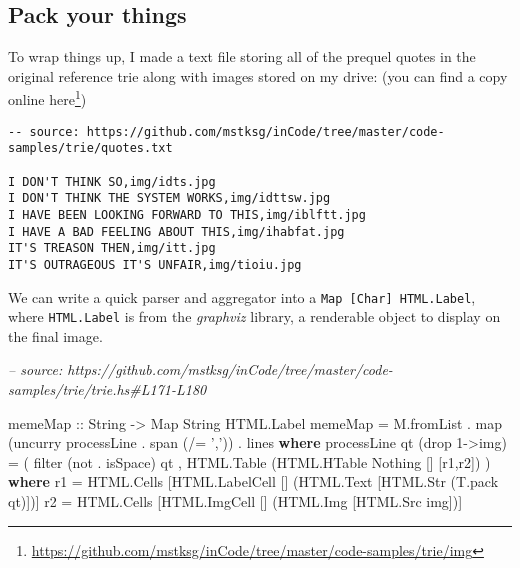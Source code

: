 \documentclass[]{article}
\newenvironment{Shaded}{}{}
\newcommand{\CharTok}[1]{\textcolor[rgb]{0.25,0.44,0.63}{#1}}
\newcommand{\CommentTok}[1]{\textcolor[rgb]{0.38,0.63,0.69}{\textit{#1}}}
\newcommand{\DataTypeTok}[1]{\textcolor[rgb]{0.56,0.13,0.00}{#1}}
\newcommand{\DecValTok}[1]{\textcolor[rgb]{0.25,0.63,0.44}{#1}}
\newcommand{\FunctionTok}[1]{\textcolor[rgb]{0.02,0.16,0.49}{#1}}
\newcommand{\KeywordTok}[1]{\textcolor[rgb]{0.00,0.44,0.13}{\textbf{#1}}}
\newcommand{\NormalTok}[1]{#1}
\newcommand{\OtherTok}[1]{\textcolor[rgb]{0.00,0.44,0.13}{#1}}
\renewcommand{\href}[2]{#2\footnote{\url{#1}}}
\begin{document}
\hypertarget{pack-your-things}{%
\subsection{Pack your things}\label{pack-your-things}}

To wrap things up, I made a text file storing all of the prequel quotes in the
original reference trie along with images stored on my drive: (you can find a
copy
\href{https://github.com/mstksg/inCode/tree/master/code-samples/trie/img}{online
here})

\begin{verbatim}
-- source: https://github.com/mstksg/inCode/tree/master/code-samples/trie/quotes.txt

I DON'T THINK SO,img/idts.jpg
I DON'T THINK THE SYSTEM WORKS,img/idttsw.jpg
I HAVE BEEN LOOKING FORWARD TO THIS,img/iblftt.jpg
I HAVE A BAD FEELING ABOUT THIS,img/ihabfat.jpg
IT'S TREASON THEN,img/itt.jpg
IT'S OUTRAGEOUS IT'S UNFAIR,img/tioiu.jpg
\end{verbatim}

We can write a quick parser and aggregator into a
\texttt{Map\ {[}Char{]}\ HTML.Label}, where \texttt{HTML.Label} is from the
\emph{graphviz} library, a renderable object to display on the final image.

\begin{Shaded}
\begin{Highlighting}[]
\CommentTok{-- source: https://github.com/mstksg/inCode/tree/master/code-samples/trie/trie.hs#L171-L180}

\OtherTok{memeMap ::} \DataTypeTok{String} \OtherTok{->} \DataTypeTok{Map} \DataTypeTok{String} \DataTypeTok{HTML.Label}
\NormalTok{memeMap }\FunctionTok{=}\NormalTok{ M.fromList }\FunctionTok{.}\NormalTok{ map (uncurry processLine }\FunctionTok{.}\NormalTok{ span (}\FunctionTok{/=} \CharTok{','}\NormalTok{)) }\FunctionTok{.}\NormalTok{ lines}
  \KeywordTok{where}
\NormalTok{    processLine qt (drop }\DecValTok{1}\OtherTok{->}\NormalTok{img) }\FunctionTok{=}\NormalTok{ (}
\NormalTok{          filter (not }\FunctionTok{.}\NormalTok{ isSpace) qt}
\NormalTok{        , }\DataTypeTok{HTML.Table}\NormalTok{ (}\DataTypeTok{HTML.HTable} \DataTypeTok{Nothing}\NormalTok{ [] [r1,r2])}
\NormalTok{        )}
      \KeywordTok{where}
\NormalTok{        r1 }\FunctionTok{=} \DataTypeTok{HTML.Cells}\NormalTok{ [}\DataTypeTok{HTML.LabelCell}\NormalTok{ [] (}\DataTypeTok{HTML.Text}\NormalTok{ [}\DataTypeTok{HTML.Str}\NormalTok{ (T.pack qt)])]}
\NormalTok{        r2 }\FunctionTok{=} \DataTypeTok{HTML.Cells}\NormalTok{ [}\DataTypeTok{HTML.ImgCell}\NormalTok{   [] (}\DataTypeTok{HTML.Img}\NormalTok{ [}\DataTypeTok{HTML.Src}\NormalTok{ img])]}
\end{Highlighting}
\end{Shaded}
\end{document}
